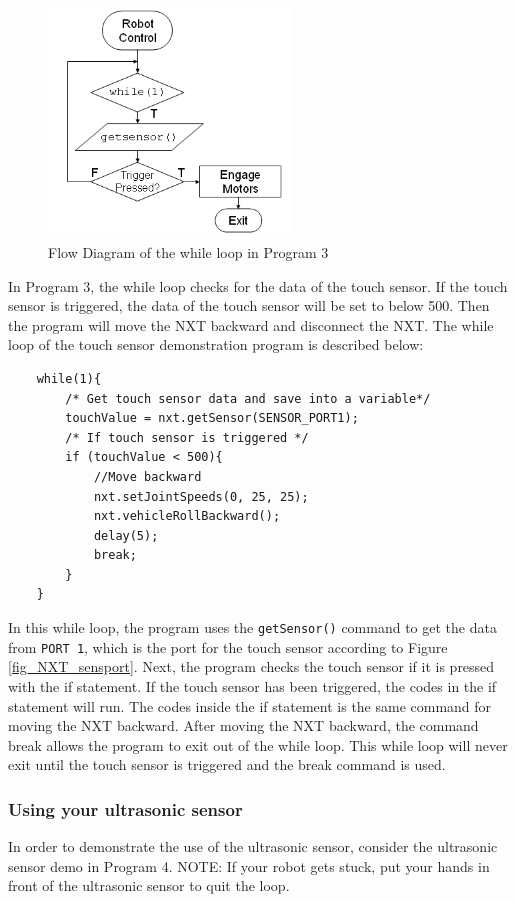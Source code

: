 \begin{figure}[h]
  \begin{center}
    \includegraphics[height=2.4in]{figure/mindstorm/NXT_touchflow.png}
    \caption{Flow Diagram of the while loop in Program 3 \label{fig_NXT_touchflow}}
  \end{center}
\end{figure}
\noindent
In Program 3, the while loop checks for the data of the touch sensor. If the touch sensor is triggered, 
the data of the touch sensor will be set to below 500. Then the program will move the NXT backward and 
disconnect the NXT. The while loop of the touch sensor demonstration program is described below:
\begin{verbatim}
    while(1){
        /* Get touch sensor data and save into a variable*/
        touchValue = nxt.getSensor(SENSOR_PORT1);
        /* If touch sensor is triggered */
        if (touchValue < 500){
            //Move backward
            nxt.setJointSpeeds(0, 25, 25);
            nxt.vehicleRollBackward();
            delay(5);
            break;
        }
    }
\end{verbatim}
In this while loop, the program uses the \verb+getSensor()+ command to get the data from \verb+PORT 1+, 
which is the port for the touch sensor according to Figure \ref{fig_NXT_sensport}. Next, the program checks 
the touch sensor if it is pressed with the if statement. If the touch sensor has been triggered, the codes 
in the if statement will run. The codes inside the if statement is the same command for moving the NXT 
backward. After moving the NXT backward, the command break allows the program to exit out of the while loop.
 This while loop will never exit until the touch sensor is triggered and the break command is used.

\subsubsection{Using your ultrasonic sensor}
In order to demonstrate the use of the ultrasonic sensor, consider the ultrasonic sensor demo in Program 4.
NOTE: If your robot gets stuck, put your hands in front of the ultrasonic sensor to quit the loop.

